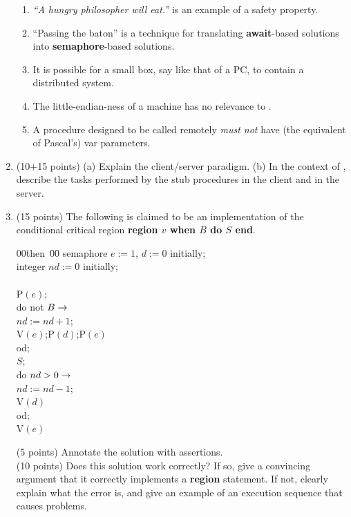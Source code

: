 \begin{enumerate}
\begin{enumerate}
\item
{\sl ``A hungry philosopher will eat.''} is an example of a safety
property.

\item
``Passing the baton'' is a technique for translating {\bf await}-based
solutions into {\bf semaphore}-based solutions.

\item It is possible for a small box, say like that of a PC, to
contain a distributed system.

\item
The little-endian-ness of a machine has no relevance to \RPC.

\item
A procedure designed to be called remotely {\em must not} have
(the equivalent of Pascal's) var parameters.


\end{enumerate}

\item (10+15 points)
(a) Explain the client/server paradigm.  (b) In the context of \RPC,
describe the tasks performed by the stub procedures in the client and
in the server.


\item (15 points)
The following is claimed to be an implementation of
the conditional critical region {\bf region $v$ when $B$ do $S$ end}.

{\bf
\begin{tabbing}
00\=then~\=00\=\kill
semaphore $e := 1$, $d := 0$ initially;\\
integer $nd := 0$ initially;\\
\\
P$(e)$;\\
do not $B \rightarrow$\+\\
  $nd := nd + 1$;\\
  V$(e)$;\quad  P$(d)$;\quad   P$(e)$\-\\
od;\\
$S$;\\
do $nd > 0 \rightarrow$\+\\
  $nd := nd - 1$;\\
  V$(d)$\-\\
od;\\
V$(e)$
\end{tabbing}
}

(5 points) Annotate the solution with assertions.\\

(10 points) Does this solution work correctly?  If so, give a
convincing argument that it correctly implements a {\bf region}
statement.  If not, clearly explain what the error is, and give an
example of an execution sequence that causes problems.

\end{enumerate}

